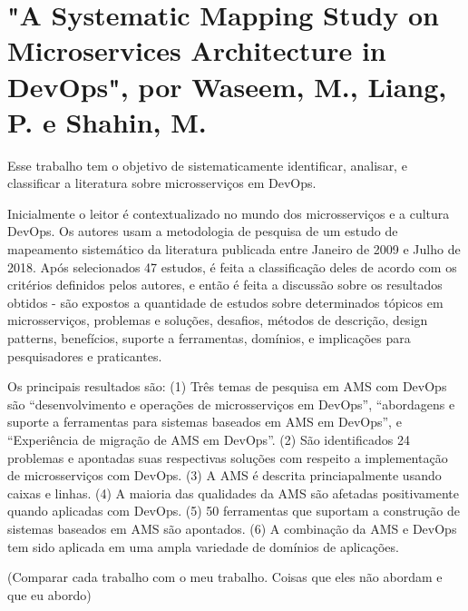 \section*{"A Systematic Mapping Study on Microservices Architecture in DevOps", por Waseem, M., Liang, P. e Shahin, M.}

Esse trabalho tem o objetivo de sistematicamente identificar, analisar, e classificar a literatura sobre microsserviços em DevOps.

Inicialmente o leitor é contextualizado no mundo dos microsserviços e a cultura DevOps. Os autores usam a metodologia de pesquisa de um estudo de mapeamento sistemático da literatura publicada entre Janeiro de 2009 e Julho de 2018. Após selecionados 47 estudos, é feita a classificação deles de acordo com os critérios definidos pelos autores, e então é feita a discussão sobre os resultados obtidos - são expostos a quantidade de estudos sobre determinados tópicos em microsserviços, problemas e soluções, desafios, métodos de descrição, design patterns, benefícios, suporte a ferramentas, domínios, e implicações para pesquisadores e praticantes.

Os principais resultados são: (1) Três temas de pesquisa em AMS com DevOps são “desenvolvimento e operações de microsserviços em DevOps”, “abordagens e suporte a ferramentas para sistemas baseados em AMS em DevOps”, e “Experiência de migração de AMS em DevOps”. (2) São identificados 24 problemas e apontadas suas respectivas soluções com respeito a implementação de microsserviços com DevOps. (3) A AMS é descrita princiapalmente usando caixas e linhas. (4) A maioria das qualidades da AMS são afetadas positivamente quando aplicadas com DevOps. (5) 50 ferramentas que suportam a construção de sistemas baseados em AMS são apontados. (6) A combinação da AMS e DevOps tem sido aplicada em uma ampla variedade de domínios de aplicações.


(Comparar cada trabalho com o meu trabalho. Coisas que eles não abordam e que eu abordo)
